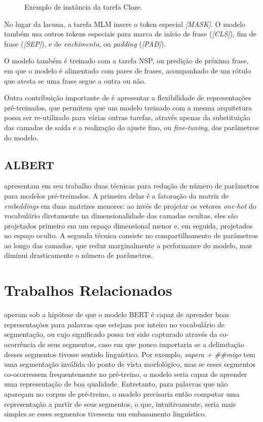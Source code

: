 \documentclass[cic,tc]{iiufrgs}
\begin{document}
\begin{figure}
    \caption{Exemplo de instância da tarefa Cloze.}
    \begin{center}
        
    \end{center}
    \label{fig:cloze}
\end{figure}

No lugar da lacuna, a tarefa MLM insere o token especial \emph{[MASK]}. O modelo também usa outros tokens especiais para marca de início de frase (\emph{[CLS]}), fim de frase (\emph{[SEP]}), e de \emph{enchimento}, ou \emph{padding} (\emph{[PAD]}).

O modelo também é treinado com a tarefa NSP, ou predição de próxima frase, em que o modelo é alimentado com pares de frases, acompanhado de um rótulo que atesta se uma frase segue a outra ou não.

Outra contribuição importante de \cite{devlin-etal-2019-bert} é apresentar a flexibilidade de representações pré-treinadas, que permitem que um modelo treinado com a mesma arquitetura possa ser re-utilizado para várias outras tarefas, através apenas da substituição das camadas de saída e a realização do ajuste fino, ou \emph{fine-tuning}, dos parâmetros do modelo.


\section{ALBERT}
\citet{Lan2020ALBERT} apresentam em seu trabalho duas técnicas para redução de número de parâmetros para modelos pré-treinados. A primeira delas é a fatoração da matriz de \emph{embeddings} em duas matrizes menores: ao invés de projetar os vetores \emph{one-hot} do vocabulário diretamente na dimensionalidade das camadas ocultas, eles são projetados primeiro em um espaço dimensional menor e, em seguida, projetados no espaço oculto. A segunda técnica consiste no compartilhamento de parâmetros ao longo das camadas, que reduz marginalmente a performance do modelo, mas diminui drasticamente o número de parâmetros.


\chapter{Trabalhos Relacionados}
 \citet{Hofmann2021SuperbizarreIN} operam sob a hipótese de que o modelo BERT é capaz de aprender boas representações para palavras que estejam por inteiro no vocabulário de segmentação, ou cujo significado possa ter sido capturado através da co-ocorrência de seus segmentos, caso em que pouco importaria se a delimitação desses segmentos tivesse sentido linguístico. Por exemplo, \emph{supera + \#\#migo} tem uma segmentação inválida do ponto de vista morfológico, mas se esses segmentos co-ocorressem frequentemente no pré-treino, o modelo seria capaz de aprender uma representação de boa qualidade. Entretanto, para palavras que não apareçam no corpus de pré-treino, o modelo precisaria então computar uma representação a partir de seus segmentos, o que, intuitivamente, seria mais simples se esses segmentos tivessem um embasamento linguístico.
 
\end{document}
